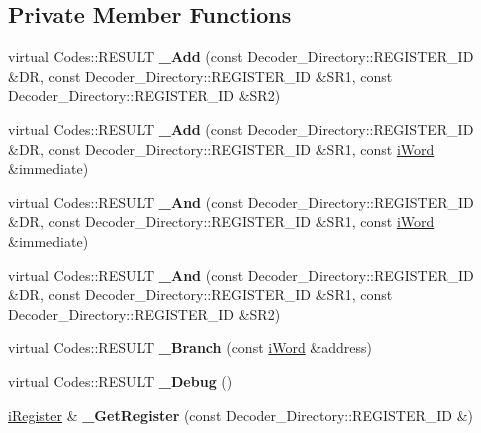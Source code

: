 \subsection*{Private Member Functions}
\begin{DoxyCompactItemize}
\item 
\hypertarget{classWi11_a90f2c17048a889b52b99ef2334f0ba55}{
virtual Codes::RESULT {\bfseries \_\-Add} (const Decoder\_\-Directory::REGISTER\_\-ID \&DR, const Decoder\_\-Directory::REGISTER\_\-ID \&SR1, const Decoder\_\-Directory::REGISTER\_\-ID \&SR2)}
\label{classWi11_a90f2c17048a889b52b99ef2334f0ba55}

\item 
\hypertarget{classWi11_a9b5e86294f943344021336108309bb52}{
virtual Codes::RESULT {\bfseries \_\-Add} (const Decoder\_\-Directory::REGISTER\_\-ID \&DR, const Decoder\_\-Directory::REGISTER\_\-ID \&SR1, const \hyperlink{classiWord}{iWord} \&immediate)}
\label{classWi11_a9b5e86294f943344021336108309bb52}

\item 
\hypertarget{classWi11_aa7a7fcfe6f5ebae0a2ab31be6029002e}{
virtual Codes::RESULT {\bfseries \_\-And} (const Decoder\_\-Directory::REGISTER\_\-ID \&DR, const Decoder\_\-Directory::REGISTER\_\-ID \&SR1, const \hyperlink{classiWord}{iWord} \&immediate)}
\label{classWi11_aa7a7fcfe6f5ebae0a2ab31be6029002e}

\item 
\hypertarget{classWi11_a9b6fb3285c524e01ae94f2204a4b50f1}{
virtual Codes::RESULT {\bfseries \_\-And} (const Decoder\_\-Directory::REGISTER\_\-ID \&DR, const Decoder\_\-Directory::REGISTER\_\-ID \&SR1, const Decoder\_\-Directory::REGISTER\_\-ID \&SR2)}
\label{classWi11_a9b6fb3285c524e01ae94f2204a4b50f1}

\item 
\hypertarget{classWi11_a01960bc45e7a70a276d91ff01cd637f9}{
virtual Codes::RESULT {\bfseries \_\-Branch} (const \hyperlink{classiWord}{iWord} \&address)}
\label{classWi11_a01960bc45e7a70a276d91ff01cd637f9}

\item 
\hypertarget{classWi11_a10d6c79140c97919e2778d1c4d6f8102}{
virtual Codes::RESULT {\bfseries \_\-Debug} ()}
\label{classWi11_a10d6c79140c97919e2778d1c4d6f8102}

\item 
\hypertarget{classWi11_a7b4a726a80ca57b9ce37d73d641b2072}{
\hyperlink{classiRegister}{iRegister} \& {\bfseries \_\-GetRegister} (const Decoder\_\-Directory::REGISTER\_\-ID \&)}
\label{classWi11_a7b4a726a80ca57b9ce37d73d641b2072}


\end{DoxyCompactItemize}
